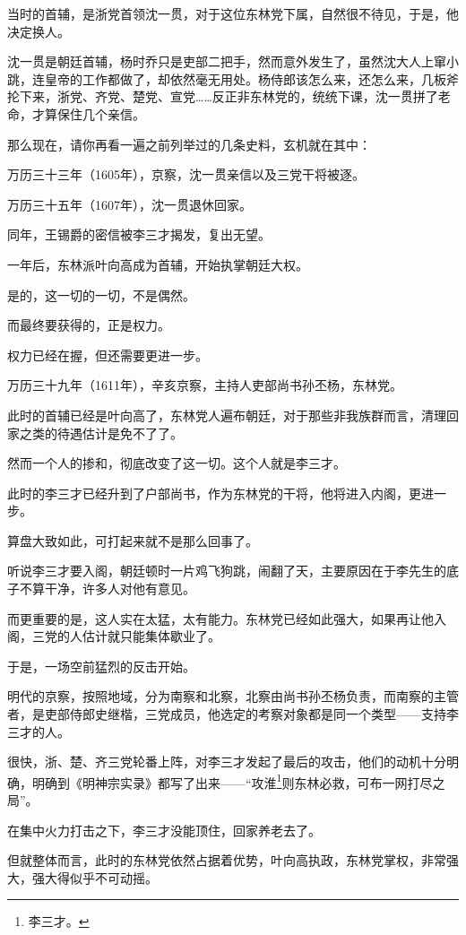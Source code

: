 \begin{multicols}{\theparacolNo}
		当时的首辅，是浙党首领沈一贯，对于这位东林党下属，自然很不待见，于是，他决定换人。

		沈一贯是朝廷首辅，杨时乔只是吏部二把手，然而意外发生了，虽然沈大人上窜小跳，连皇帝的工作都做了，却依然毫无用处。杨侍郎该怎么来，还怎么来，几板斧抡下来，浙党、齐党、楚党、宣党……反正非东林党的，统统下课，沈一贯拼了老命，才算保住几个亲信。

		那么现在，请你再看一遍之前列举过的几条史料，玄机就在其中：

		万历三十三年（1605年），京察，沈一贯亲信以及三党干将被逐。

		万历三十五年（1607年），沈一贯退休回家。

		同年，王锡爵的密信被李三才揭发，复出无望。

		一年后，东林派叶向高成为首辅，开始执掌朝廷大权。

		是的，这一切的一切，不是偶然。

		而最终要获得的，正是权力。

		权力已经在握，但还需要更进一步。

		万历三十九年（1611年），辛亥京察，主持人吏部尚书孙丕杨，东林党。

		此时的首辅已经是叶向高了，东林党人遍布朝廷，对于那些非我族群而言，清理回家之类的待遇估计是免不了了。

		然而一个人的掺和，彻底改变了这一切。这个人就是李三才。

		此时的李三才已经升到了户部尚书，作为东林党的干将，他将进入内阁，更进一步。

		算盘大致如此，可打起来就不是那么回事了。

		听说李三才要入阁，朝廷顿时一片鸡飞狗跳，闹翻了天，主要原因在于李先生的底子不算干净，许多人对他有意见。

		而更重要的是，这人实在太猛，太有能力。东林党已经如此强大，如果再让他入阁，三党的人估计就只能集体歇业了。

		于是，一场空前猛烈的反击开始。

		明代的京察，按照地域，分为南察和北察，北察由尚书孙丕杨负责，而南察的主管者，是吏部侍郎史继楷，三党成员，他选定的考察对象都是同一个类型——支持李三才的人。

		很快，浙、楚、齐三党轮番上阵，对李三才发起了最后的攻击，他们的动机十分明确，明确到《明神宗实录》都写了出来——“攻淮\footnote{李三才。}则东林必救，可布一网打尽之局”。

		在集中火力打击之下，李三才没能顶住，回家养老去了。

		但就整体而言，此时的东林党依然占据着优势，叶向高执政，东林党掌权，非常强大，强大得似乎不可动摇。


\end{multicols}
